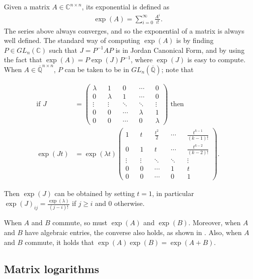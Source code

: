 Given a matrix $A \in \mathbb{C}^{n \times n}$, its exponential is defined as
\begin{align*}
\exp(A) = \sum \limits_{i=0}^{\infty} \frac{A^{i}}{i!} .
\end{align*}
The series above always converges, and so the exponential of a matrix is always well defined. The standard way of computing $\exp(A)$ is by finding $P \in \mathit{GL}_{n}(\mathbb{C})$ such that $J=P^{-1}AP$ is in Jordan Canonical Form, and by using the fact that $\exp(A) = P \exp(J) P^{-1}$, where $\exp(J)$ is easy to compute. When $A \in \overline{\mathbb{Q}}^{n \times n}$, $P$ can be taken to be in $GL_{n}(\overline{\mathbb{Q}})$; note that

\begin{align*}
\mbox{if } J &= \begin{pmatrix}
\lambda && 1 && 0 && \cdots && 0 \\
0 && \lambda && 1 &&\cdots && 0 \\
\vdots && \vdots && \ddots && \ddots && \vdots \\
0 && 0 && \cdots && \lambda && 1 \\
0 && 0 && \cdots && 0 && \lambda
\end{pmatrix} \mbox{ then } \\
\exp(Jt) &= \exp(\lambda t) \begin{pmatrix}
1 && t && \frac{t^{2}}{2} && \cdots && \frac{t^{k-1}}{(k-1)!} \\
0 && 1 && t && \cdots && \frac{t^{k-2}}{(k-2)!} \\
\vdots && \vdots &&\ddots && \ddots && \vdots \\
0 && 0 && \cdots && 1 && t \\
0 && 0 && \cdots && 0 && 1
\end{pmatrix} .
\end{align*}

Then $\exp(J)$ can be obtained by setting $t=1$, in particular $\exp(J)_{ij} = \frac{\exp(\lambda)}{(j-i)!}$ if $j \geq i$ and $0$ otherwise.

When $A$ and $B$ commute, so must $\exp(A)$ and $\exp(B)$. Moreover, when $A$ and $B$ have algebraic entries, the converse also holds, as shown in \cite{MatrixExps}. Also, when $A$ and $B$ commute, it holds that $\exp(A)\exp(B) = \exp(A+B)$.

\subsection{Matrix logarithms}

